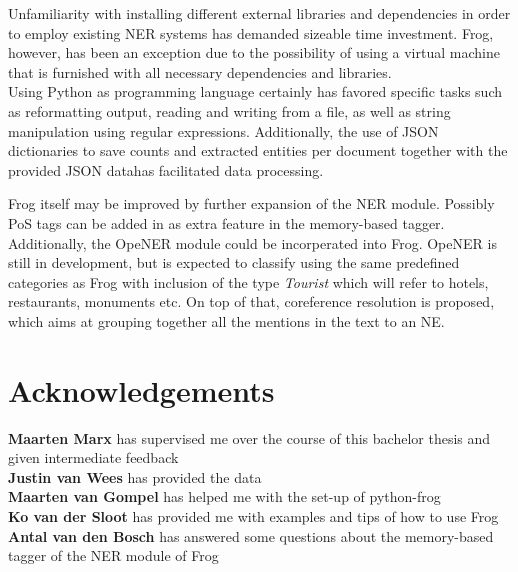Unfamiliarity with installing different external libraries and dependencies in order to employ existing NER systems has demanded sizeable time investment. Frog, however, has been an exception due to the possibility of using a virtual machine that is furnished with all necessary dependencies and libraries. \\
Using Python as programming language certainly has favored specific tasks such as reformatting output, reading and writing from a file, as well as string manipulation using regular expressions. Additionally, the use of JSON dictionaries to save counts and extracted entities per document {\textendash}together with the provided JSON data\textendash has facilitated data processing.

Frog itself may be improved by further expansion of the NER module. Possibly PoS tags can be added in as extra feature in the memory-based tagger. Additionally, the OpeNER module  \cite{agerri2013opener} could be incorperated into Frog. OpeNER is still in development, but is expected to classify using the same predefined categories as Frog with inclusion of the type \emph{Tourist} which will refer to hotels, restaurants, monuments etc. On top of that, coreference resolution is proposed, which aims at grouping together all the mentions in the text to an NE.

\section{Acknowledgements}
\textbf{Maarten Marx} has supervised me over the course of this bachelor thesis and given intermediate feedback\\
\textbf{Justin van Wees} has provided the data\\
\textbf{Maarten van Gompel} has helped me with the set-up of python-frog\\
\textbf{Ko van der Sloot} has provided me with examples and tips of how to use Frog\\
\textbf{Antal van den Bosch} has answered some questions about the memory-based tagger of the NER module of Frog\\

